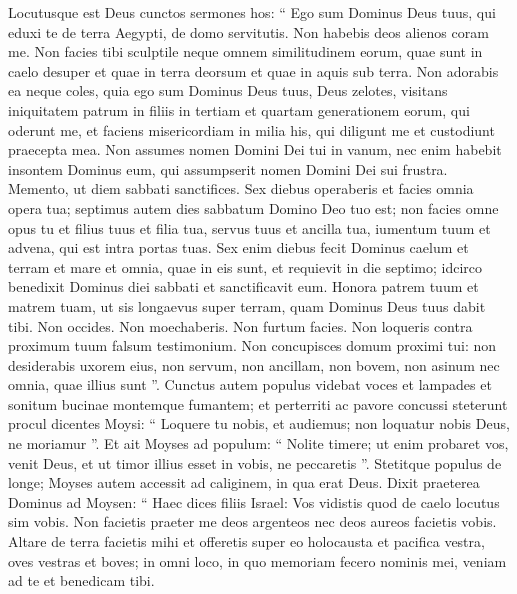 \begin{biblechapter}
\begin{biblechapter}
\begin{biblechapter}
\begin{biblechapter}
\begin{biblechapter}
\begin{biblechapter}
\begin{biblechapter}
\begin{biblechapter}
\begin{biblechapter}
\begin{biblechapter}
\begin{biblechapter}
\begin{biblechapter}
\begin{biblechapter}
\begin{biblechapter}
\begin{biblechapter}
\begin{biblechapter}
\begin{biblechapter}
\begin{biblechapter}
\begin{biblechapter}
\begin{biblechapter}
\verse Locutusque est Deus cunctos sermones hos:
 \verse “ Ego sum Dominus Deus tuus, qui eduxi te de terra Aegypti, de domo servitutis.
 \verse Non habebis deos alienos coram me. 
\verse Non facies tibi sculptile neque omnem similitudinem eorum, quae sunt in caelo desuper et quae in terra deorsum et quae in aquis sub terra. 
\verse Non adorabis ea neque coles, quia ego sum Dominus Deus tuus, Deus zelotes, visitans iniquitatem patrum in filiis in tertiam et quartam generationem eorum, qui oderunt me, 
\verse et faciens misericordiam in milia his, qui diligunt me et custodiunt praecepta mea.
 \verse Non assumes nomen Domini Dei tui in vanum, nec enim habebit insontem Dominus eum, qui assumpserit nomen Domini Dei sui frustra.
 \verse Memento, ut diem sabbati sanctifices. 
\verse Sex diebus operaberis et facies omnia opera tua; 
\verse septimus autem dies sabbatum Domino Deo tuo est; non facies omne opus tu et filius tuus et filia tua, servus tuus et ancilla tua, iumentum tuum et advena, qui est intra portas tuas. 
\verse Sex enim diebus fecit Dominus caelum et terram et mare et omnia, quae in eis sunt, et requievit in die septimo; idcirco benedixit Dominus diei sabbati et sanctificavit eum.
 \verse Honora patrem tuum et matrem tuam, ut sis longaevus super terram, quam Dominus Deus tuus dabit tibi.
 \verse Non occides.
 \verse Non moechaberis.
 \verse Non furtum facies.
 \verse Non loqueris contra proximum tuum falsum testimonium.
 \verse Non concupisces domum proximi tui: non desiderabis uxorem eius, non servum, non ancillam, non bovem, non asinum nec omnia, quae illius sunt ”.
 \verse Cunctus autem populus videbat voces et lampades et sonitum bucinae montemque fumantem; et perterriti ac pavore concussi steterunt procul 
\verse dicentes Moysi: “ Loquere tu nobis, et audiemus; non loquatur nobis Deus, ne moriamur ”. 
 \verse Et ait Moyses ad populum: “ Nolite timere; ut enim probaret vos, venit Deus, et ut timor illius esset in vobis, ne peccaretis ”. 
\verse Stetitque populus de longe; Moyses autem accessit ad caliginem, in qua erat Deus.
 \verse Dixit praeterea Dominus ad Moysen: “ Haec dices filiis Israel: Vos vidistis quod de caelo locutus sim vobis. 
\verse Non facietis praeter me deos argenteos nec deos aureos facietis vobis. 
\verse Altare de terra facietis mihi et offeretis super eo holocausta et pacifica vestra, oves vestras et boves; in omni loco, in quo memoriam fecero nominis mei, veniam ad te et benedicam tibi. 

\end{biblechapter}
\end{biblechapter}
\end{biblechapter}
\end{biblechapter}
\end{biblechapter}
\end{biblechapter}
\end{biblechapter}
\end{biblechapter}
\end{biblechapter}
\end{biblechapter}
\end{biblechapter}
\end{biblechapter}
\end{biblechapter}
\end{biblechapter}
\end{biblechapter}
\end{biblechapter}
\end{biblechapter}
\end{biblechapter}
\end{biblechapter}
\end{biblechapter}
